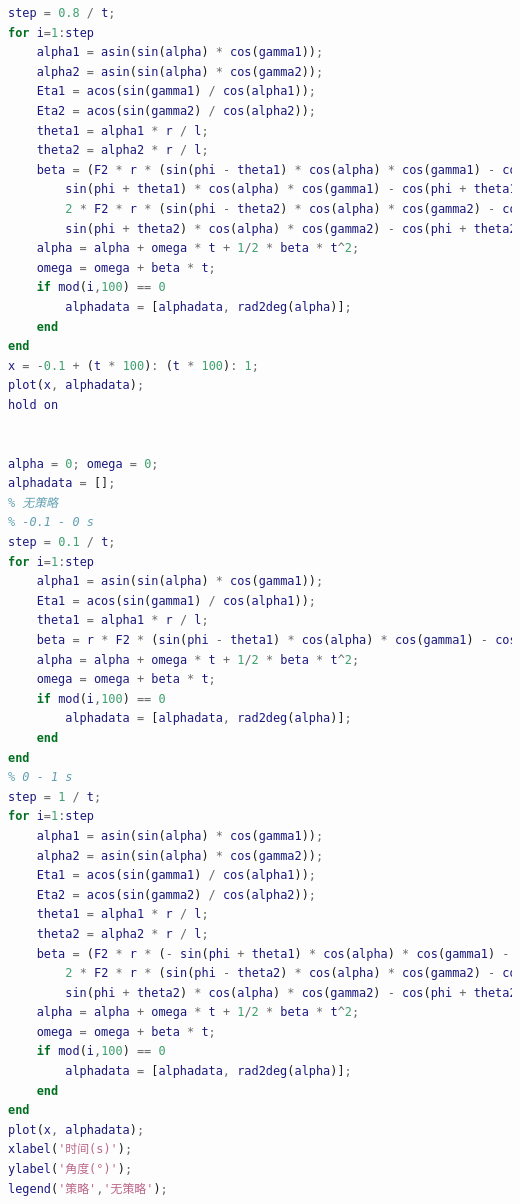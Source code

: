 \documentclass{cumcm}
\begin{document}
\begin{lstlisting}[language=matlab]
% 0.2 - 1 s 正常发力
step = 0.8 / t;
for i=1:step
    alpha1 = asin(sin(alpha) * cos(gamma1));
    alpha2 = asin(sin(alpha) * cos(gamma2));
    Eta1 = acos(sin(gamma1) / cos(alpha1));
    Eta2 = acos(sin(gamma2) / cos(alpha2));
    theta1 = alpha1 * r / l;
    theta2 = alpha2 * r / l;
    beta = (F2 * r * (sin(phi - theta1) * cos(alpha) * cos(gamma1) - cos(phi - theta1) * sin(alpha1) * sin(Eta1) - ...
        sin(phi + theta1) * cos(alpha) * cos(gamma1) - cos(phi + theta1) * sin(alpha1) * sin(Eta1)) + ...
        2 * F2 * r * (sin(phi - theta2) * cos(alpha) * cos(gamma2) - cos(phi - theta2) * sin(alpha2) * sin(Eta2) - ...
        sin(phi + theta2) * cos(alpha) * cos(gamma2) - cos(phi + theta2) * sin(alpha2) * sin(Eta2))) / J;
    alpha = alpha + omega * t + 1/2 * beta * t^2;
    omega = omega + beta * t;
    if mod(i,100) == 0
        alphadata = [alphadata, rad2deg(alpha)];
    end
end
x = -0.1 + (t * 100): (t * 100): 1;
plot(x, alphadata);
hold on


alpha = 0; omega = 0;
alphadata = [];
% 无策略
% -0.1 - 0 s
step = 0.1 / t;
for i=1:step
    alpha1 = asin(sin(alpha) * cos(gamma1));
    Eta1 = acos(sin(gamma1) / cos(alpha1));
    theta1 = alpha1 * r / l;
    beta = r * F2 * (sin(phi - theta1) * cos(alpha) * cos(gamma1) - cos(phi - theta1) * sin(alpha1) * sin(Eta1)) / J;
    alpha = alpha + omega * t + 1/2 * beta * t^2;
    omega = omega + beta * t;
    if mod(i,100) == 0
        alphadata = [alphadata, rad2deg(alpha)];
    end
end
% 0 - 1 s
step = 1 / t;
for i=1:step
    alpha1 = asin(sin(alpha) * cos(gamma1));
    alpha2 = asin(sin(alpha) * cos(gamma2));
    Eta1 = acos(sin(gamma1) / cos(alpha1));
    Eta2 = acos(sin(gamma2) / cos(alpha2));
    theta1 = alpha1 * r / l;
    theta2 = alpha2 * r / l;
    beta = (F2 * r * (- sin(phi + theta1) * cos(alpha) * cos(gamma1) - cos(phi + theta1) * sin(alpha1) * sin(Eta1)) + ...
        2 * F2 * r * (sin(phi - theta2) * cos(alpha) * cos(gamma2) - cos(phi - theta2) * sin(alpha2) * sin(Eta2) - ...
        sin(phi + theta2) * cos(alpha) * cos(gamma2) - cos(phi + theta2) * sin(alpha2) * sin(Eta2))) / J;
    alpha = alpha + omega * t + 1/2 * beta * t^2;
    omega = omega + beta * t;
    if mod(i,100) == 0
        alphadata = [alphadata, rad2deg(alpha)];
    end
end
plot(x, alphadata);
xlabel('时间(s)');
ylabel('角度(°)');
legend('策略','无策略');
\end{lstlisting}
\end{document}
